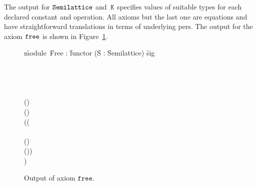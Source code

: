 The output for $\mathtt{Semilattice}$ and~$\mathtt{K}$ specifies
values of suitable types for each declared constant and operation. All
axioms but the last one are equations and have straightforward
translations in terms of underlying pers. The output for the axiom
$\mathtt{free}$ is shown in Figure~\ref{fig:free}.
%
\begin{figure}
  \centering
\begin{showOutputSmall}
\f{module}\ \f{Free} : \f{functor} (\f{S} : \f{Semilattice}) \to \f{sig}\\
\quad {}
\\
\quad
{}
\\
\quad\quad
{}\\
\qquad\qquad {} \land {} \land {}\\
\qquad\qquad () \land {} \\
\qquad\qquad () \land {} \\
\qquad\qquad
((\\
\qquad\qquad\qquad
{} \land
{} \land {} \\
\qquad\qquad\qquad () \land {} \\
\qquad\qquad\qquad
()) \Rightarrow {} \\
\qquad\qquad
{})
\end{showOutputSmall}%
  \caption{Output of axiom $\texttt{free}$.}
  \label{fig:free}
\end{figure}
